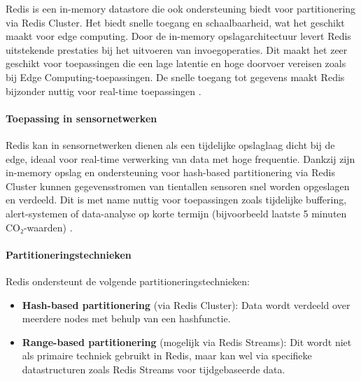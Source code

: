 Redis is een in-memory datastore die ook ondersteuning biedt voor partitionering via Redis Cluster. Het biedt snelle toegang en schaalbaarheid, wat het geschikt maakt voor edge computing. Door de in-memory opslagarchitectuur levert Redis uitstekende prestaties bij het uitvoeren van invoegoperaties. Dit maakt het zeer geschikt voor toepassingen die een lage latentie en hoge doorvoer vereisen zoals bij Edge Computing-toepassingen. De snelle toegang tot gegevens maakt Redis bijzonder nuttig voor real-time toepassingen \autocite{RedisDocumentation}.

\paragraph{Toepassing in sensornetwerken}  
Redis kan in sensornetwerken dienen als een tijdelijke opslaglaag dicht bij de edge, ideaal voor real-time verwerking van data met hoge frequentie. Dankzij zijn in-memory opslag en ondersteuning voor hash-based partitionering via Redis Cluster kunnen gegevensstromen van tientallen sensoren snel worden opgeslagen en verdeeld. Dit is met name nuttig voor toepassingen zoals tijdelijke buffering, alert-systemen of data-analyse op korte termijn (bijvoorbeeld laatste 5 minuten CO₂-waarden) \autocite{RedisDocumentation, Mahmud2020}.

\paragraph{Partitioneringstechnieken}  
Redis ondersteunt de volgende partitioneringstechnieken:
\begin{itemize}
    \item \textbf{Hash-based partitionering} (via Redis Cluster): Data wordt verdeeld over meerdere nodes met behulp van een hashfunctie.
    \item \textbf{Range-based partitionering} (mogelijk via Redis Streams): Dit wordt niet als primaire techniek gebruikt in Redis, maar kan wel via specifieke datastructuren zoals Redis Streams voor tijdgebaseerde data.
\end{itemize}


